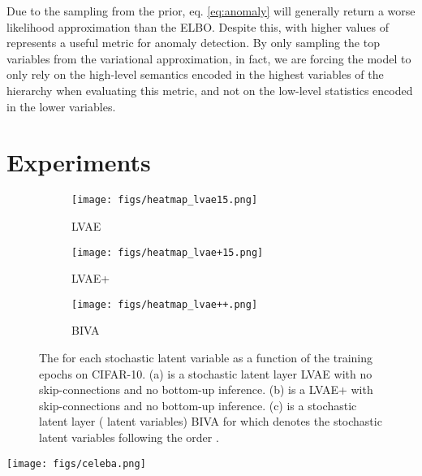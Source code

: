 \documentclass{article}
\def\nm{BIVA\xspace}
\begin{document}
Due to the sampling from the prior, eq. \eqref{eq:anomaly} will generally return a worse likelihood approximation than the ELBO. Despite this,  with higher values of  represents a useful metric for anomaly detection. 
By only sampling the top  variables from the variational approximation, in fact, we are forcing the model to only rely on the high-level semantics encoded in the highest variables of the hierarchy when evaluating this metric, and not on the low-level statistics encoded in the lower variables. 


\section{Experiments}\label{sec:experiments}


\begin{figure}
  \begin{minipage}[c]{0.56\textwidth}
\begin{subfigure}{0.32\textwidth}
\centering
\texttt{[image: figs/heatmap\_lvae15.png]}
\caption{LVAE }
\end{subfigure}
\hfill
\begin{subfigure}{0.32\textwidth}
\centering
\texttt{[image: figs/heatmap\_lvae+15.png]}
\caption{LVAE+ }
\end{subfigure}
\hfill
\begin{subfigure}{0.32\textwidth}
\centering
\texttt{[image: figs/heatmap\_lvae++.png]}
\caption{\nm }
\end{subfigure}
\end{minipage}\hfill
  \begin{minipage}[c]{0.41\textwidth}
\caption{The  for each stochastic latent variable as a function of the training epochs on CIFAR-10. (a) is a  stochastic latent layer LVAE with no skip-connections and no bottom-up inference. (b) is a  LVAE+ with skip-connections and no bottom-up inference. (c) is a  stochastic latent layer ( latent variables) \nm for which  denotes the stochastic latent variables following the order .}
\label{fig:latent_variables}
  \end{minipage}
  \vspace*{-0.5cm}
\end{figure}


\begin{figure*}[!t]
\centering
\texttt{[image: figs/celeba.png]}
\caption{(left) images from the CelebA dataset preprocessed to 64x64 following \citep{Larsen16}. (right)  generations of \nm with  layers that achieves a  bits/dim on the test set.}
\label{fig:celeb_gen}
	\vspace*{-0.4cm}
\end{figure*}
\end{document}
